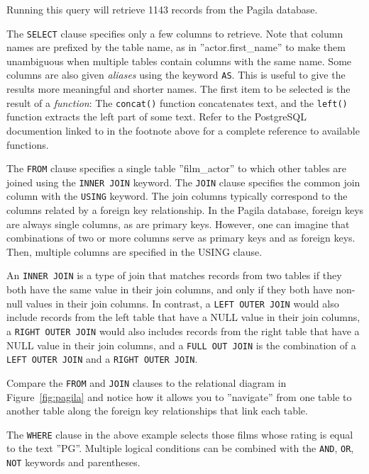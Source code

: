 Running this query will retrieve 1143 records from the Pagila database. 

The \texttt{SELECT} clause specifies only a few columns to retrieve. Note that column names are prefixed by the table name, as in ''actor.first\_name'' to make them unambiguous when multiple tables contain columns with the same name. Some columns are also given \emph{aliases} using the keyword \texttt{AS}. This is useful to give the results more meaningful and shorter names. The first item to be selected is the result of a \emph{function}: The \texttt{concat()} function concatenates text, and the \texttt{left()} function extracts the left part of some text. Refer to the PostgreSQL documention linked to in the footnote above for a complete reference to available functions. 

The \texttt{FROM} clause specifies a single table ''film\_actor'' to which other tables are joined using the \texttt{INNER JOIN} keyword. The \texttt{JOIN} clause specifies the common join column with the \texttt{USING} keyword. The join columns typically correspond to the columns related by a foreign key relationship. In the Pagila database, foreign keys are always single columns, as are primary keys. However, one can imagine that combinations of two or more columns serve as primary keys and as foreign keys. Then, multiple columns are specified in the USING clause.

An \texttt{INNER JOIN} is a type of join that matches records from two tables if they both have the same value in their join columns, and only if they both have non-null values in their join columns. In contrast, a \texttt{LEFT OUTER JOIN} would also include records from the left table that have a NULL value in their join columns, a \texttt{RIGHT OUTER JOIN} would also includes records from the right table that have a NULL value in their join columns, and a \texttt{FULL OUT JOIN} is the combination of a \texttt{LEFT OUTER JOIN} and a \texttt{RIGHT OUTER JOIN}.

Compare the \texttt{FROM} and \texttt{JOIN} clauses to the relational diagram in Figure~\ref{fig:pagila} and notice how it allows you to ''navigate'' from one table to another table along the foreign key relationships that link each table.

The \texttt{WHERE} clause in the above example selects those films whose rating is equal to the text ''PG''. Multiple logical conditions can be combined with the \texttt{AND}, \texttt{OR}, \texttt{NOT} keywords and parentheses.

